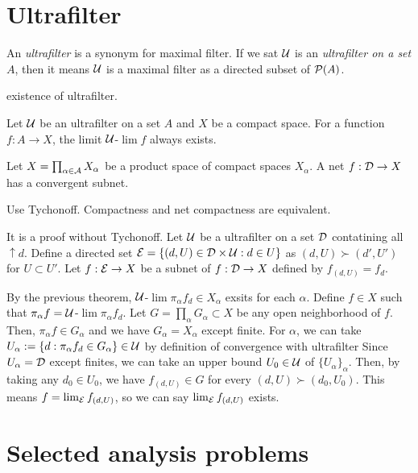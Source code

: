 \documentclass[11pt]{article}
\let\realsection\section
\renewcommand\section{\newpage\realsection}
\begin{document}
\section{Ultrafilter}
\begin{defn}
An \emph{ultrafilter} is a synonym for maximal filter.
If we sat $\mathcal{U}$ is an \emph{ultrafilter on a set} $A$, then it means $\mathcal{U}$ is a maximal filter as a directed subset of $\mathcal{P}(A)$.
\end{defn}
existence of ultrafilter.
\begin{thm}
Let $\mathcal{U}$ be an ultrafilter on a set $A$ and $X$ be a compact space.
For a function $f:A\to X$, the limit $\mathcal{U}$-$\lim f$ always exists.
\end{thm}

\begin{thm}
Let $X=\prod_{\alpha\in\mathcal{A}}X_\alpha$ be a product space of compact spaces $X_\alpha$.
A net $f:\cD\to X$ has a convergent subnet.
\end{thm}
\begin{pf}[1]
Use Tychonoff.
Compactness and net compactness are equivalent.
\end{pf}
\begin{pf}[2]
It is a proof without Tychonoff.
Let $\mathcal{U}$ be a ultrafilter on a set $\mathcal{D}$ contatining all $\uparrow d$.
Define a directed set $\mathcal{E}=\{(d,U)\in\mathcal{D}\times\mathcal{U}:d\in U\}$ as $(d,U)\succ(d',U')$ for $U\subset U'$.
Let $f:\cE\to X$ be a subnet of $f:\cD\to X$ defined by $f_{(d,U)}=f_d$.

By the previous theorem, $\mathcal{U}$-$\lim\pi_\alpha f_d\in X_\alpha$ exsits for each $\alpha$.
Define $f\in X$ such that $\pi_\alpha f=\mathcal{U}$-$\lim\pi_\alpha f_d$.
Let $G=\prod_\alpha G_\alpha\subset X$ be any open neighborhood of $f$.
Then, $\pi_\alpha f\in G_\alpha$ and we have $G_\alpha=X_\alpha$ except finite.
For $\alpha$, we can take $U_\alpha:=\{d:\pi_\alpha f_d\in G_\alpha\}\in\mathcal{U}$ by definition of convergence with ultrafilter
Since $U_\alpha=\mathcal{D}$ except finites, we can take an upper bound $U_0\in\mathcal{U}$ of $\{U_\alpha\}_\alpha$.
Then, by taking any $d_0\in U_0$, we have $f_{(d,U)}\in G$ for every $(d,U)\succ(d_0,U_0)$.
This means $f=\lim_{\mathcal{E}} f_{(d,U)}$, so we can say $\lim_{\mathcal{E}} f_{(d,U)}$ exists.
\end{pf}







\section{Selected analysis problems}
\end{document}
